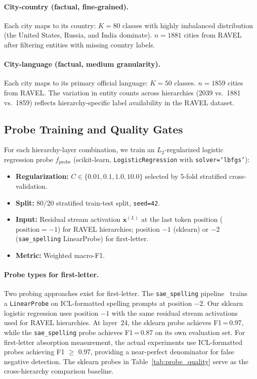 \documentclass{article}
\begin{document}
\paragraph{City-country (factual, fine-grained).} Each city maps to its country: $K = 80$ classes with highly imbalanced distribution (the United States, Russia, and India dominate). $n = 1881$ cities from RAVEL after filtering entities with missing country labels.

\paragraph{City-language (factual, medium granularity).} Each city maps to its primary official language: $K = 50$ classes. $n = 1859$ cities from RAVEL. The variation in entity counts across hierarchies (2039 vs.\ 1881 vs.\ 1859) reflects hierarchy-specific label availability in the RAVEL dataset.

\subsection{Probe Training and Quality Gates}
\label{sec:probes}

For each hierarchy-layer combination, we train an $L_2$-regularized logistic regression probe $f_{\text{probe}}$ (scikit-learn, \texttt{LogisticRegression} with \texttt{solver=`lbfgs'}):

\begin{itemize}
\item \textbf{Regularization:} $C \in \{0.01, 0.1, 1.0, 10.0\}$ selected by 5-fold stratified cross-validation.
\item \textbf{Split:} 80/20 stratified train-test split, \texttt{seed=42}.
\item \textbf{Input:} Residual stream activation $\mathbf{x}^{(L)}$ at the last token position ($\text{position} = -1$) for RAVEL hierarchies; position $-1$ (sklearn) or $-2$ (\texttt{sae\_spelling} LinearProbe) for first-letter.
\item \textbf{Metric:} Weighted macro-F1.
\end{itemize}

\paragraph{Probe types for first-letter.} Two probing approaches exist for first-letter. The \texttt{sae\_spelling} pipeline~\citep{chanin2024absorption} trains a \texttt{LinearProbe} on ICL-formatted spelling prompts at position $-2$. Our sklearn logistic regression uses position $-1$ with the same residual stream activations used for RAVEL hierarchies. At layer~24, the sklearn probe achieves F1\,=\,0.97, while the \texttt{sae\_spelling} probe achieves F1\,=\,0.87 on its own evaluation set. For first-letter absorption measurement, the actual experiments use ICL-formatted probes achieving F1 $\geq$ 0.97, providing a near-perfect denominator for false negative detection. The sklearn probes in Table~\ref{tab:probe_quality} serve as the cross-hierarchy comparison baseline.
\end{document}
